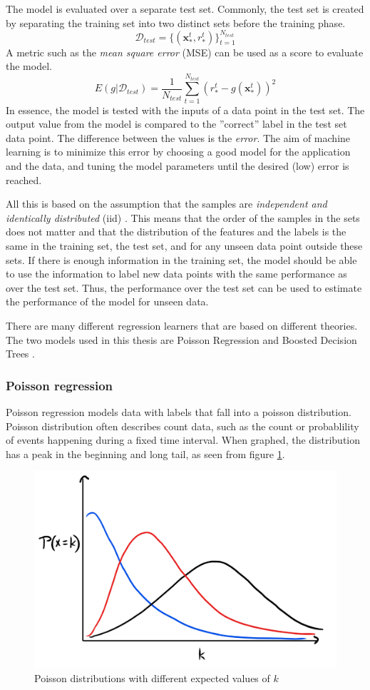 The model is evaluated over a separate test set.
Commonly, the test set is created by separating the training set into two distinct sets before the training phase.
$$\mathcal{D}_{test} = \{ (\mathbf{x}_*^t , r_*^t) \}_{t=1}^{N_{test}}$$
A metric such as the \emph{mean square error} (MSE) can be used as a score to evaluate the model. \cite{alpaydin}
$$E(g | \mathcal{D}_{test}) = \frac{1}{N_{test}} \sum_{t=1}^{N_{test}} (r_*^t - g(\mathbf{x}_*^t))^2$$
In essence, the model is tested with the inputs of a data point in the test set. The output value from the model is compared to the ''correct'' label in the test set data point.
The difference between the values is the \emph{error}.
The aim of machine learning is to minimize this error by choosing a good model for the application and the data, and tuning the model parameters until the desired (low) error is reached.

All this is based on the assumption that the samples are \textit{independent and identically distributed} (iid) \cite{alpaydin}.
This means that the order of the samples in the sets does not matter and that the distribution of the features and the labels is the same in the training set, the test set, and for any unseen data point outside these sets.
If there is enough information in the training set, the model should be able to use the information to label new data points with the same performance as over the test set.
Thus, the performance over the test set can be used to estimate the performance of the model for unseen data.

There are many different regression learners that are based on different theories. The two models used in this thesis are Poisson Regression \cite{azurepoisson} and Boosted Decision Trees \cite{azurebdt}.

\subsubsection{Poisson regression}

Poisson regression models data with labels that fall into a poisson distribution.
Poisson distribution often describes count data, such as the count or probablility of events happening during a fixed time interval. \cite{osgood2000poisson}
When graphed, the distribution has a peak in the beginning and long tail, as seen from figure \ref{fig:poissongraphs}.

\begin{figure}[htb]
\centering \includegraphics[width=0.6\linewidth]{gfx/figures/poissongraphs.png}
\caption{Poisson distributions with different expected values of $k$}
\label{fig:poissongraphs}
\end{figure}

